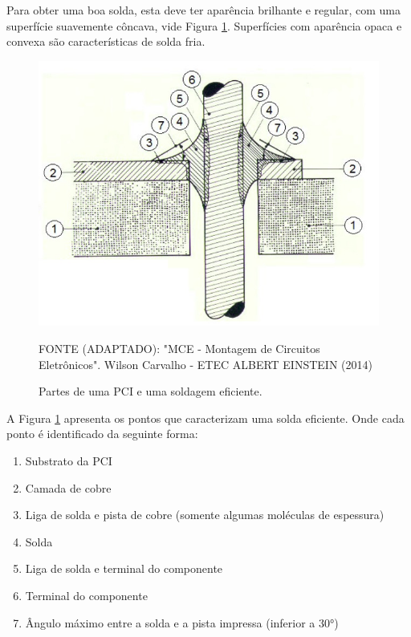 Para obter uma boa solda, esta deve ter aparência brilhante e regular, com uma superfície suavemente côncava, vide Figura \ref{fig:Solda Ideal}. Superfícies com aparência opaca e convexa são características de solda fria.

\begin{figure}[H]
  \centering
  \includegraphics[width=\textwidth]{Figuras/soldagem_ideal.jpeg}
  \caption{Partes de uma PCI e uma soldagem eficiente.} 
 { \footnotesize FONTE (ADAPTADO): "MCE - Montagem de Circuitos Eletrônicos". 
 Wilson Carvalho - ETEC ALBERT EINSTEIN (2014)} 
  \label{fig:Solda Ideal}
\end{figure}

A Figura \ref{fig:Solda Ideal} apresenta os pontos que caracterizam uma solda eficiente. Onde cada ponto é identificado da seguinte forma:

\begin{enumerate}
    \item Substrato da PCI
    \item Camada de cobre
    \item Liga de solda e pista de cobre (somente algumas moléculas de espessura)
    \item Solda
    \item Liga de solda e terminal do componente
    \item Terminal do componente
    \item Ângulo máximo entre a solda e a pista impressa (inferior a 30°)
\end{enumerate}

\newpage

